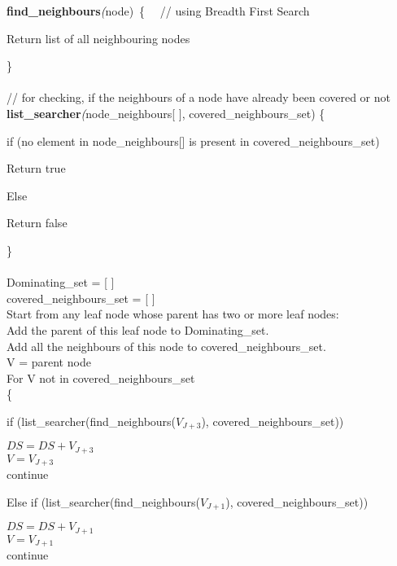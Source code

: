 \documentclass[letterpaper, 11pt]{article}
\begin{document}
\begin{tcolorbox}
        \textbf{find\_neighbours}\textit(node)\ \{ \ \ // using Breadth First Search 
\begin{adjustwidth}{0.5cm}{}
Return list of all neighbouring nodes
\end{adjustwidth}
\}\\\\
// for checking, if the neighbours of a node have already been covered or not\\
\textbf{list\_searcher}\textit(node\_neighbours[ ], covered\_neighbours\_set) \{
\begin{adjustwidth}{0.5cm}{}
if (no element in node\_neighbours[] is present  in covered\_neighbours\_set)
\begin{adjustwidth}{0.5cm}{}
Return true 
\end{adjustwidth}
Else
	\begin{adjustwidth}{0.5cm}{}
Return false 
\end{adjustwidth}

\end{adjustwidth}
\}
\\\\
Dominating\_set = [ ]\\
covered\_neighbours\_set =  [ ]\\

Start from any leaf node whose parent has two or more leaf nodes:\\
Add the parent of this leaf node to Dominating\_set.\\
Add all the neighbours of this node to covered\_neighbours\_set.\\

V = parent node\\
For V not in covered\_neighbours\_set \\
\{
\begin{adjustwidth}{0.5cm}{}
    if (list\_searcher(find\_neighbours($V_{J+3}$),  covered\_neighbours\_set))
        \begin{adjustwidth}{0.5cm}{}

		    $DS = DS + V_{J+3}$\\
		    $V = V_{J+3}$\\
            continue
            \end{adjustwidth}
        
        Else if (list\_searcher(find\_neighbours($V_{J+1}$),  covered\_neighbours\_set))
        \begin{adjustwidth}{0.5cm}{}
		   $DS = DS + V_{J+1}$\\
		    $V = V_{J+1}$\\
            continue
            \end{adjustwidth}


\end{adjustwidth}
\end{tcolorbox}
\end{document}
